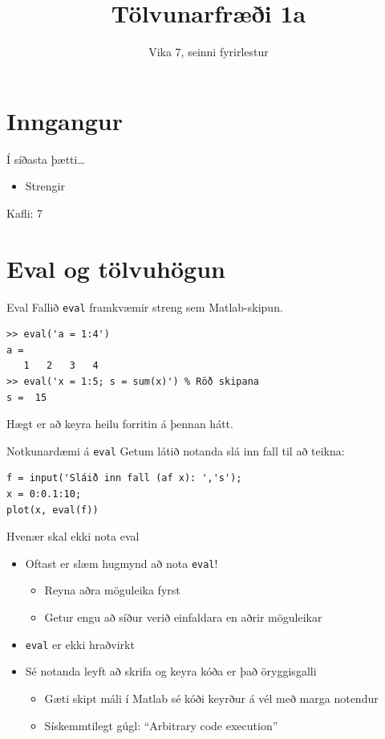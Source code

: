 \documentclass[handout]{beamer}
\title{Tölvunarfræði 1a}
\subtitle{Vika 7, seinni fyrirlestur}
\begin{document}
\begin{frame}
\titlepage
\end{frame}

\section{Inngangur}

\begin{frame}{Í síðasta þætti\ldots}
\begin{itemize}
 \item Strengir
\end{itemize}
Kafli: 7 
\end{frame}

\section{Eval og tölvuhögun}

\begin{frame}[fragile]{Eval}
Fallið \texttt{eval} framkvæmir streng sem Matlab-skipun.

\begin{verbatim}
>> eval('a = 1:4')
a =
   1   2   3   4
>> eval('x = 1:5; s = sum(x)') % Röð skipana
s =  15
\end{verbatim}

Hægt er að keyra heilu forritin á þennan hátt.
\end{frame}

\begin{frame}[fragile]{Notkunardæmi á \texttt{eval}}
Getum látið notanda slá inn fall til að teikna:
\begin{verbatim}
f = input('Sláið inn fall (af x): ','s');
x = 0:0.1:10;
plot(x, eval(f))
\end{verbatim}
\end{frame}

\begin{frame}{Hvenær skal ekki nota eval}
\begin{itemize}
 \item Oftast er slæm hugmynd að nota \texttt{eval}!
 \begin{itemize}
  \item Reyna aðra möguleika fyrst
  \item Getur engu að síður verið einfaldara en aðrir möguleikar
 \end{itemize}
 \item \texttt{eval} er ekki hraðvirkt
 \item Sé notanda leyft að skrifa og keyra kóða er það öryggisgalli
 \begin{itemize}
  \item Gæti skipt máli í Matlab sé kóði keyrður á vél með marga notendur
  \item Sískemmtilegt gúgl: ``Arbitrary code execution'' 
 \end{itemize}
\end{itemize}
\end{frame}
\end{document}
